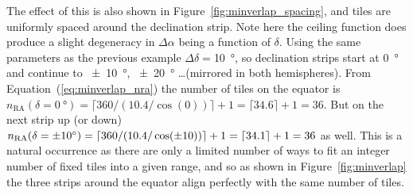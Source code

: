 \begin{colsection}
\begin{colsection}
The effect of this is also shown in Figure~\ref{fig:minverlap_spacing}, and tiles are uniformly spaced around the declination strip. Note here the ceiling function does produce a slight degeneracy in $\Delta\alpha$ being a function of $\delta$. Using the same parameters as the previous example $\Delta\delta=$\SI{10}{\degree}, so declination strips start at \SI{0}{\degree} and continue to \SI{\pm10}{\degree}, \SI{\pm20}{\degree} \ldots (mirrored in both hemispheres). From Equation~(\ref{eq:minverlap_nra}) the number of tiles on the equator is $n_\text{RA}(\delta=\SI{0}{\degree}) = \lceil 360/(10.4/\cos(0)) \rceil + 1 = \lceil 34.6 \rceil + 1 = 36$. But on the next strip up (or down) $n_\text{RA}(\delta=\SI{\pm10}{\degree}) = \lceil 360/(10.4/\cos(\pm10)) \rceil + 1 = \lceil 34.1 \rceil + 1 = 36$ as well. This is a natural occurrence as there are only a limited number of ways to fit an integer number of fixed tiles into a given range, and so as shown in Figure~\ref{fig:minverlap} the three strips around the equator align perfectly with the same number of tiles.



\end{colsection}
\end{colsection}
